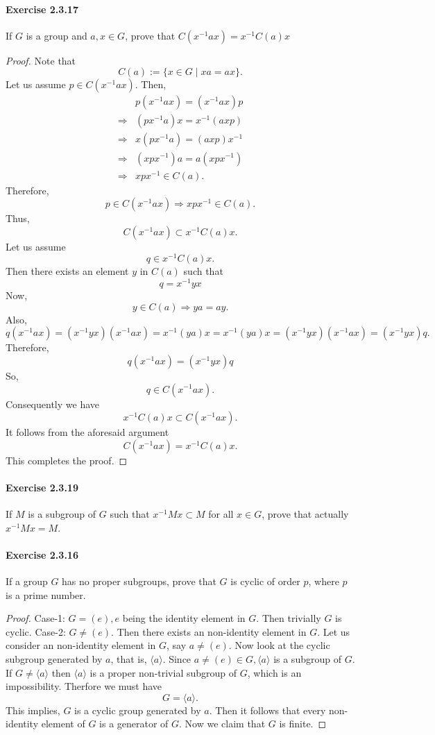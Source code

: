 \documentclass{article}
\begin{document}
\paragraph{Exercise 2.3.17} If $G$ is a group and $a, x \in G$, prove that $C\left(x^{-1} a x\right)=x^{-1} C(a) x$
\begin{proof}
    Note that
$$
C(a):=\{x \in G \mid x a=a x\} .
$$
Let us assume $p \in C\left(x^{-1} a x\right)$. Then,
$$
\begin{aligned}
& p\left(x^{-1} a x\right)=\left(x^{-1} a x\right) p \\
\Longrightarrow & \left(p x^{-1} a\right) x=x^{-1}(a x p) \\
\Longrightarrow & x\left(p x^{-1} a\right)=(a x p) x^{-1} \\
\Longrightarrow & \left(x p x^{-1}\right) a=a\left(x p x^{-1}\right) \\
\Longrightarrow & x p x^{-1} \in C(a) .
\end{aligned}
$$
Therefore,
$$
p \in C\left(x^{-1} a x\right) \Longrightarrow x p x^{-1} \in C(a) .
$$
Thus,
$$
C\left(x^{-1} a x\right) \subset x^{-1} C(a) x .
$$
Let us assume
$$
q \in x^{-1} C(a) x .
$$
Then there exists an element $y$ in $C(a)$ such that
$$
q=x^{-1} y x
$$
Now,
$$
y \in C(a) \Longrightarrow y a=a y .
$$
Also,
$$
q\left(x^{-1} a x\right)=\left(x^{-1} y x\right)\left(x^{-1} a x\right)=x^{-1}(y a) x=x^{-1}(y a) x=\left(x^{-1} y x\right)\left(x^{-1} a x\right)=\left(x^{-1} y x\right) q .
$$
Therefore,
$$
q\left(x^{-1} a x\right)=\left(x^{-1} y x\right) q
$$
So,
$$
q \in C\left(x^{-1} a x\right) .
$$
Consequently we have
$$
x^{-1} C(a) x \subset C\left(x^{-1} a x\right) .
$$
It follows from the aforesaid argument
$$
C\left(x^{-1} a x\right)=x^{-1} C(a) x .
$$
This completes the proof.
\end{proof}


\paragraph{Exercise 2.3.19} If $M$ is a subgroup of $G$ such that $x^{-1} M x \subset M$ for all $x \in G$, prove that actually $x^{-1} M x=M$. 

\paragraph{Exercise 2.3.16} If a group $G$ has no proper subgroups, prove that $G$ is cyclic of order $p$, where $p$ is a prime number.
\begin{proof}
    Case-1: $G=(e), e$ being the identity element in $G$. Then trivially $G$ is cyclic.
    Case-2: $G \neq(e)$. Then there exists an non-identity element in $G.$ Let us consider an non-identity element in $G$, say $a\neq (e)$. Now look at the cyclic subgroup generated by $a$, that is, $\langle a\rangle$. Since
    $a\neq (e) \in G,\langle a\rangle$ is a subgroup of $G$.
If $G \neq\langle a\rangle$ then $\langle a\rangle$ is a proper non-trivial subgroup of $G$, which is an impossibility. Therfore we must have
$$
G=\langle a\rangle .
$$
This implies, $G$ is a cyclic group generated by $a$. Then it follows that every non-identity element of $G$ is a generator of $G$. Now we claim that $G$ is finite.
\end{proof}
\end{document}
